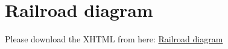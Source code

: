 \section{Railroad diagram}
\label{sec:grail-road}
Please download the XHTML from here:
\href{https://jalafoundation.sharepoint.com/:f:/s/Hufflepuff/ErFqJU6p4FxEgBk5uNLO8roB_9C-gxkLEHgCD3RY1p6p8A?e=heQfNq}{Railroad diagram}
